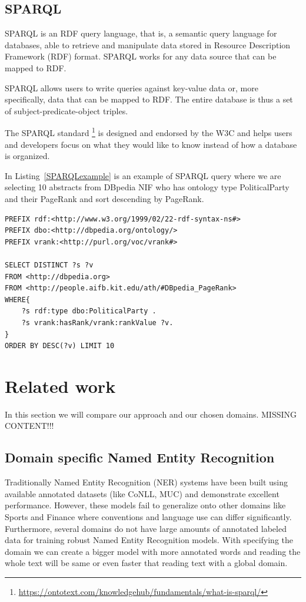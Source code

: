 \documentclass[thesis=M,english]{FITthesis}[2018/05/30]
\begin{document}
\subsection{SPARQL}\label{SPARQL}
	SPARQL \cite{master:SPARQL} is an RDF query language, that is, a semantic query language for databases, able to retrieve and manipulate data stored in Resource Description Framework (RDF) format. SPARQL works for any data source that can be mapped to RDF.

	SPARQL allows users to write queries against key-value data or, more specifically, data that can be mapped to RDF. The entire database is thus a set of subject-predicate-object triples.
	
	The SPARQL standard \footnote{\url{https://ontotext.com/knowledgehub/fundamentals/what-is-sparql/}} is designed and endorsed by the W3C and helps users and developers focus on what they would like to know instead of how a database is organized.

	In Listing~\ref{SPARQLexample} is an example of SPARQL query where we are selecting 10 abstracts from DBpedia NIF who has ontology type PoliticalParty and their PageRank and sort descending by PageRank.   
\begin{lstlisting}[caption=SPARQL example \label{SPARQLexample}]
PREFIX rdf:<http://www.w3.org/1999/02/22-rdf-syntax-ns#>
PREFIX dbo:<http://dbpedia.org/ontology/>
PREFIX vrank:<http://purl.org/voc/vrank#>

SELECT DISTINCT ?s ?v
FROM <http://dbpedia.org>
FROM <http://people.aifb.kit.edu/ath/#DBpedia_PageRank>
WHERE{
	?s rdf:type dbo:PoliticalParty .
	?s vrank:hasRank/vrank:rankValue ?v.
}
ORDER BY DESC(?v) LIMIT 10
\end{lstlisting}

\section{Related work}
In this section we will compare our approach and our chosen domains.
MISSING CONTENT!!!

\subsection{Domain specific Named Entity Recognition}
Traditionally Named Entity Recognition (NER)\cite{article:DomainSpecific} systems have been built using available annotated datasets (like CoNLL, MUC) and demonstrate excellent performance. However, these models fail to generalize onto other domains like Sports and Finance where conventions and language use can differ significantly. Furthermore, several domains do not have large amounts of annotated labeled data for training robust Named Entity Recognition models.
With specifying the domain we can create a bigger model with more annotated words and reading the whole text will be same or even faster that reading text with a global domain.  
\end{document}
